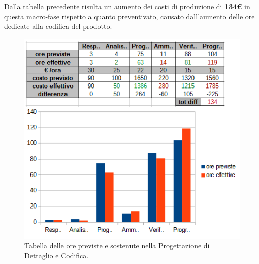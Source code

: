 \clearpage
Dalla tabella precedente risulta un aumento dei costi di produzione di \textbf{134€} in questa macro-fase rispetto a quanto preventivato, causato dall'aumento delle ore dedicate alla codifica del prodotto.

\begin{figure}[H]
\begin{center}
\includegraphics[scale=0.70]{img/consuntivo-progdet-tot.png}
\caption{Tabella delle ore previste e sostenute nella Progettazione di Dettaglio e Codifica.}
\end{center}
\end{figure}

